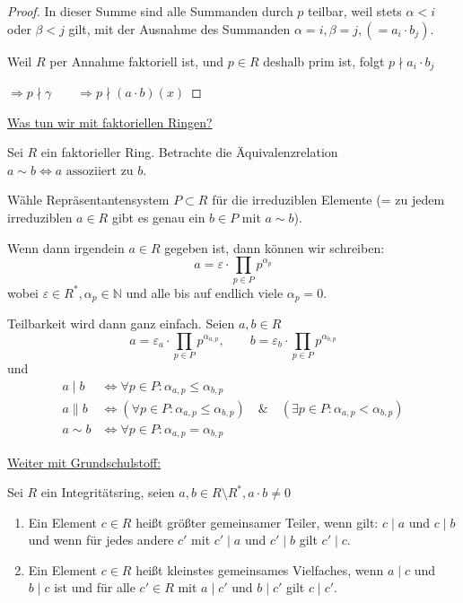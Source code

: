 \documentclass[a4paper,12pt,numbers=noenddot,parskip=full]{scrartcl}
\newcommand{\setN}{\mathbb{N}}
\newcommand{\heading}{\underline}
\theoremstyle{dotless}
\theoremstyle{remark}
\begin{document}
\begin{proof}
		In dieser Summe sind alle Summanden durch $p$ teilbar, weil stets $\alpha < i$ oder $\beta < j$ gilt, mit der Ausnahme des Summanden $\alpha = i, \beta = j, (= a_i \cdot b_j)$.
		
		Weil $R$ per Annahme faktoriell ist, und $p \in R$ deshalb prim ist, folgt $ p \nmid a_i \cdot b_j$
		
		$\Rightarrow p \nmid \gamma \qquad \Rightarrow p \nmid (a \cdot b)(x)$
	\end{proof}

	\heading{Was tun wir mit faktoriellen Ringen?}
	
	Sei $R$ ein faktorieller Ring. Betrachte die Äquivalenzrelation $a \sim b \Leftrightarrow a \text{ assoziiert zu } b$.
	
	Wähle Repräsentantensystem $P \subset R$ für die irreduziblen Elemente (= zu jedem irreduziblen $a \in R$ gibt es genau ein $b \in P$ mit $a \sim b$).
	
	Wenn dann irgendein $a \in R$ gegeben ist, dann können wir schreiben:
	\begin{equation*}
		a = \varepsilon \cdot \prod_{p \in P} p^{\alpha_p}
	\end{equation*}
	wobei $\varepsilon \in R^*, \alpha_p \in \setN$ und alle bis auf endlich viele $\alpha_p = 0$.
	
	Teilbarkeit wird dann ganz einfach. Seien $a, b \in R$
	\begin{equation*}
		a = \varepsilon_a \cdot \prod_{p \in P} p^{\alpha_{a,p}}, \qquad b = \varepsilon_b \cdot \prod_{p \in P} p^{\alpha_{b,p}}
	\end{equation*}
	und
	\begin{align*}
		a \mid b &\Leftrightarrow \forall p \in P: \alpha_{a,p} \leq \alpha_{b,p} \\
		a \parallel b &\Leftrightarrow (\forall p \in P: \alpha_{a,p} \leq \alpha_{b,p}) \quad\&\quad (\exists p \in P: \alpha_{a,p} < \alpha_{b,p})\\
		a \sim b &\Leftrightarrow \forall p \in P: \alpha_{a,p} = \alpha_{b,p}
	\end{align*}
	
	\heading{Weiter mit Grundschulstoff:}
	
	Sei $R$ ein Integritätsring, seien $a,b \in R \setminus R^*, a \cdot b \neq 0$
	
	\begin{enumerate}
		\item Ein Element $c \in R$ heißt größter gemeinsamer Teiler, wenn gilt: $c \mid a$ und $c \mid b$ und wenn für jedes andere $c'$ mit $c' \mid a$ und $c' \mid b$ gilt $c' \mid c$.
		\item Ein Element $c \in R$ heißt kleinstes gemeinsames Vielfaches, wenn $a \mid c$ und $b \mid c$ ist und für alle $c' \in R$ mit $a \mid c'$ und $b \mid c'$ gilt $c \mid c'$.
	\end{enumerate}
\end{document}
